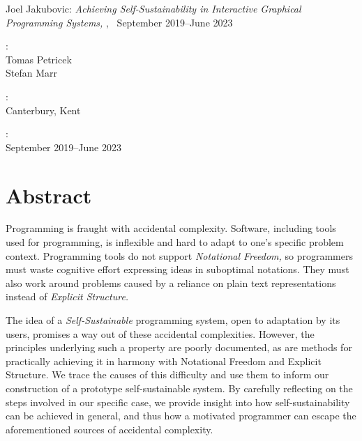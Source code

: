 \documentclass[ twoside,openright,titlepage,numbers=noenddot,headinclude,footinclude,cleardoublepage=empty,abstract=on,
                BCOR=5mm,paper=a4,fontsize=11pt
                ]{scrreprt}
\newcommand{\myTitle}{Achieving Self-Sustainability in Interactive Graphical Programming Systems\xspace}
\newcommand{\mySubtitle}{\xspace}
\newcommand{\myName}{Joel Jakubovic\xspace}
\newcommand{\myProf}{Tomas Petricek\xspace}
\newcommand{\myOtherProf}{Stefan Marr\xspace}
\newcommand{\myLocation}{Canterbury, Kent\xspace}
\newcommand{\myTime}{September 2019--June 2023\xspace}
\newcommand{\joel}[1]{}
\theoremstyle{definition}
\begin{document}
\hfill

\vfill

\noindent\myName: \textit{\myTitle,} \mySubtitle, \textcopyright\ \myTime

\bigskip

\noindent{}: \\
\myProf \\
\myOtherProf \\
\medskip

\noindent{}: \\
\myLocation

\medskip

\noindent{}: \\
\myTime
\clearpage{}
\cleardoublepage\clearpage{}
\begingroup
\let\clearpage\relax
\let\cleardoublepage\relax
\let\cleardoublepage\relax

\chapter*{Abstract}
\joel{https://plg.uwaterloo.ca/~migod/research/beckOOPSLA.html
problem
why it's a problem
startling sentence
implications
}

Programming is fraught with accidental complexity. Software, including
tools used for programming, is inflexible and hard to adapt to one's
specific problem context. Programming tools do not support
\emph{Notational Freedom,} so programmers must waste cognitive effort
expressing ideas in suboptimal notations. They must also work around
problems caused by a reliance on plain text representations instead of
\emph{Explicit Structure.}

The idea of a \emph{Self-Sustainable} programming system, open to
adaptation by its users, promises a way out of these accidental
complexities. However, the principles underlying such a property are
poorly documented, as are methods for practically achieving it in
harmony with Notational Freedom and Explicit Structure. We trace the
causes of this difficulty and use them to inform our construction of a
prototype self-sustainable system. By carefully reflecting on the steps
involved in our specific case, we provide insight into how
self-sustainability can be achieved in general, and thus how a motivated
programmer can escape the aforementioned sources of accidental
complexity.

\joel{One must translate ideas into suboptimal notations, work around problems created by plain text representations, and invest disproportionate effort to remove these accidental complexities on a case-by-case basis. }
 
\end{document}
